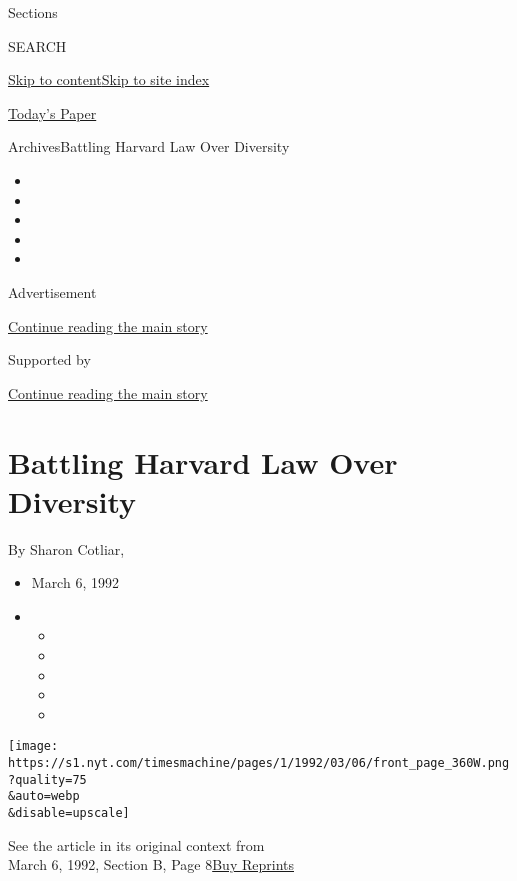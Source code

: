 Sections

SEARCH

\protect\hyperlink{site-content}{Skip to
content}\protect\hyperlink{site-index}{Skip to site index}

\href{https://myaccount.nytimes.com/auth/login?response_type=cookie\&client_id=vi}{}

\href{https://www.nytimes.com/section/todayspaper}{Today's Paper}

Archives\textbar{}Battling Harvard Law Over Diversity

\begin{itemize}
\item
\item
\item
\item
\item
\end{itemize}

Advertisement

\protect\hyperlink{after-top}{Continue reading the main story}

Supported by

\protect\hyperlink{after-sponsor}{Continue reading the main story}

\hypertarget{battling-harvard-law-over-diversity}{%
\section{Battling Harvard Law Over
Diversity}\label{battling-harvard-law-over-diversity}}

By Sharon Cotliar,

\begin{itemize}
\item
  March 6, 1992
\item
  \begin{itemize}
  \item
  \item
  \item
  \item
  \item
  \end{itemize}
\end{itemize}

\texttt{[image: https://s1.nyt.com/timesmachine/pages/1/1992/03/06/front\_page\_360W.png?quality=75\\\&auto=webp\\\&disable=upscale]}

See the article in its original context from\\
March 6, 1992, Section B, Page
8\href{https://store.nytimes.com/collections/new-york-times-page-reprints?utm_source=nytimes\&utm_medium=article-page\&utm_campaign=reprints}{Buy
Reprints}

